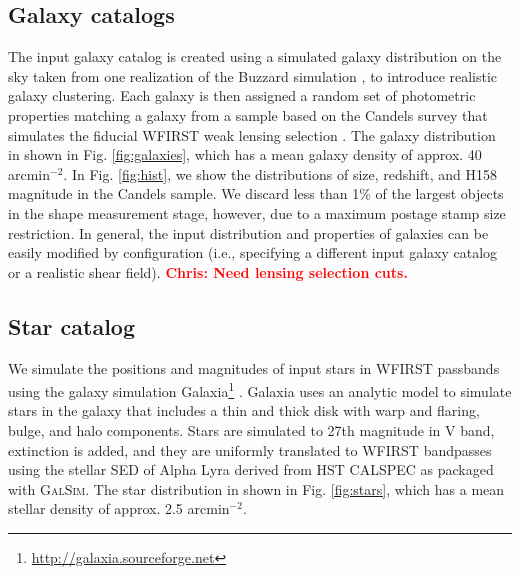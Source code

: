 \documentclass[aps,prd, amsmath,amssymb,superscriptaddress,showkeys,nofootinbib,reprint,preprintnumbers]{revtex4-1}
\newcommand{\verify}[1]{\textcolor{red}{\textbf{{#1}}}}
\newcommand{\galsim}{\textsc{GalSim}}
\begin{document}
\subsection{Galaxy catalogs}\label{galcats}

The input galaxy catalog is created using a simulated galaxy distribution on the sky taken from one realization of the Buzzard simulation \cite{2019arXiv190102401D,wechsler2019}, to introduce realistic galaxy clustering. 
Each galaxy is then assigned a random set of photometric properties matching a galaxy from a sample based on the Candels survey that simulates the fiducial WFIRST weak lensing selection \cite{2019ApJ...877..117H}. 
The galaxy distribution in shown in Fig. \ref{fig:galaxies}, which has a mean galaxy density of approx. 40 arcmin$^{-2}$. 
In Fig. \ref{fig:hist}, we show the distributions of size, redshift, and H158 magnitude in the Candels sample. 
We discard less than 1\% of the largest objects in the shape measurement stage, however, due to a maximum postage stamp size restriction. 
In general, the input distribution and properties of galaxies can be easily modified by configuration (i.e., specifying a different input galaxy catalog or a realistic shear field).
\verify{Chris: Need lensing selection cuts.}

\subsection{Star catalog}\label{starcat}

We simulate the positions and magnitudes of input stars in WFIRST passbands using the galaxy simulation Galaxia\footnote{\url{http://galaxia.sourceforge.net}} \cite{galaxia}. 
Galaxia uses an analytic model \cite{galaxia2} to simulate stars in the galaxy that includes a thin and thick disk with warp and flaring, bulge, and halo components. 
Stars are simulated to 27th magnitude in V band, extinction is added, and they are uniformly translated to WFIRST bandpasses using the stellar SED of Alpha Lyra derived from HST CALSPEC as packaged with \galsim.  The star distribution in shown in Fig. \ref{fig:stars}, which has a mean stellar density of approx. 2.5 arcmin$^{-2}$. 
\end{document}
